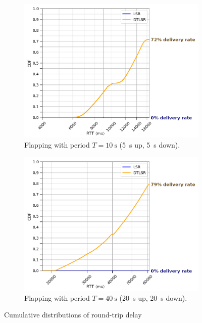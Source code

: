 \documentclass[withindex,glossary,openany]{cam-thesis}
\begin{document}
\begin{figure}[H]
\centering
\begin{subfigure}{.8\textwidth}
  \centering
  \hspace*{1.1cm}
  \includegraphics[width=1\linewidth]{delay_full_partition_flap5}
  \caption{Flapping with period $T=\SI{10}{\s}$ (\SI{5}{\s} up, \SI{5}{\s} down).}
  \label{fig:full_partition_flap5}
\end{subfigure}

\begin{subfigure}{.8\textwidth}
  \centering
  \hspace*{1.1cm}
  \includegraphics[width=1\linewidth]{delay_full_partition_flap20}
  \caption{Flapping with period $T=\SI{40}{\s}$ (\SI{20}{\s} up, \SI{20}{\s} down).}
  \label{fig:full_partition_flap20}
\end{subfigure}
\caption{Cumulative distributions of round-trip delay}
\label{fig:full_partition_flap}
\end{figure}
\end{document}
